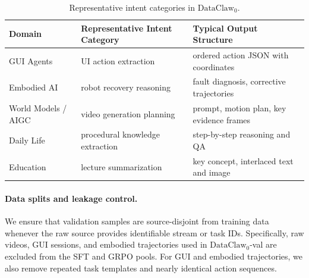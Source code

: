 
\begin{table}[h]
\centering
\small
\caption{Representative intent categories in $\text{DataClaw}_0$.}
\label{tab:intent_categories}
\begin{tabular}{lll}
\toprule
Domain & Representative Intent Category & Typical Output Structure \\
\midrule
GUI Agents & UI action extraction & ordered action JSON with coordinates \\
Embodied AI & robot recovery reasoning & fault diagnosis, corrective trajectories \\
World Models / AIGC & video generation planning & prompt, motion plan, key evidence frames \\
Daily Life & procedural knowledge extraction & step-by-step reasoning and QA \\
Education & lecture summarization & key concept, interlaced text and image \\
\bottomrule
\end{tabular}
\end{table}

\paragraph{Data splits and leakage control.}
We ensure that validation samples are source-disjoint from training data whenever the raw source provides identifiable stream or task IDs. Specifically, raw videos, GUI sessions, and embodied trajectories used in $\text{DataClaw}_0$-val are excluded from the SFT and GRPO pools. For GUI and embodied trajectories, we also remove repeated task templates and nearly identical action sequences.


